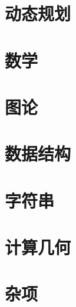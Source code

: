 \documentclass[a4paper]{book}
\begin{document}
    \clearpage
    \chapter{动态规划}
    

    \chapter{数学}
    

    \chapter{图论}
    

    \chapter{数据结构}
    

    \chapter{字符串}
    

    \chapter{计算几何}
    

    \chapter{杂项}
    
\end{document}

